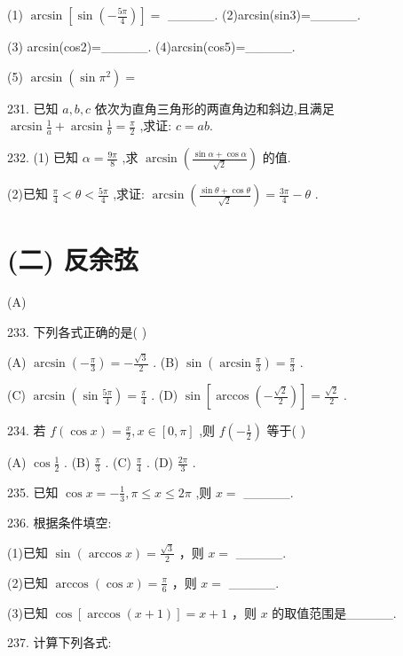 \documentclass[10pt]{article}
\begin{document}
(1) \(\arcsin \left\lbrack  {\sin \left( {-\frac{5\pi }{4}}\right) }\right\rbrack   =\) \_\_\_\_\_. (2)arcsin(sin3)=\_\_\_\_\_.

(3) arcsin(cos2)=\_\_\_\_\_. (4)arcsin(cos5)=\_\_\_\_\_.

(5) \(\arcsin \left( {\sin {\pi }^{2}}\right)  =\)

231. 已知 \(a,b,c\) 依次为直角三角形的两直角边和斜边,且满足 \(\arcsin \frac{1}{a} + \arcsin \frac{1}{b} = \frac{\pi }{2}\) ,求证: \(c = {ab}.\)

232. (1) 已知 \(\alpha  = \frac{9\pi }{8}\) ,求 \(\arcsin \left( \frac{\sin \alpha  + \cos \alpha }{\sqrt{2}}\right)\) 的值.

(2)已知 \(\frac{\pi }{4} < \theta  < \frac{5\pi }{4}\) ,求证: \(\arcsin \left( \frac{\sin \theta  + \cos \theta }{\sqrt{2}}\right)  = \frac{3\pi }{4} - \theta\) .

\section*{(二) 反余弦}

(A)

233. 下列各式正确的是( )

(A) \(\arcsin \left( {-\frac{\pi }{3}}\right)  =  - \frac{\sqrt{3}}{2}\) . (B) \(\sin \left( {\arcsin \frac{\pi }{3}}\right)  = \frac{\pi }{3}\) .

(C) \(\arcsin \left( {\sin \frac{5\pi }{4}}\right)  = \frac{\pi }{4}\) . (D) \(\sin \left\lbrack  {\arccos \left( {-\frac{\sqrt{2}}{2}}\right) }\right\rbrack   = \frac{\sqrt{2}}{2}\) .

234. 若 \(f\left( {\cos x}\right)  = \frac{x}{2},x \in  \left\lbrack  {0,\pi }\right\rbrack\) ,则 \(f\left( {-\frac{1}{2}}\right)\) 等于( )

(A) \(\cos \frac{1}{2}\) . (B) \(\frac{\pi }{3}\) . (C) \(\frac{\pi }{4}\) . (D) \(\frac{2\pi }{3}\) .

235. 已知 \(\cos x =  - \frac{1}{3},\pi  \leq  x \leq  {2\pi }\) ,则 \(x =\) \_\_\_\_\_.

236. 根据条件填空:

(1)已知 \(\sin \left( {\arccos x}\right)  = \frac{\sqrt{3}}{2}\) ，则 \(x =\) \_\_\_\_\_.

(2)已知 \(\arccos \left( {\cos x}\right)  = \frac{\pi }{6}\) ，则 \(x =\) \_\_\_\_\_.

(3)已知 \(\cos \left\lbrack  {\arccos \left( {x + 1}\right) }\right\rbrack   = x + 1\) ，则 \(x\) 的取值范围是\_\_\_\_\_.

237. 计算下列各式:
\end{document}
